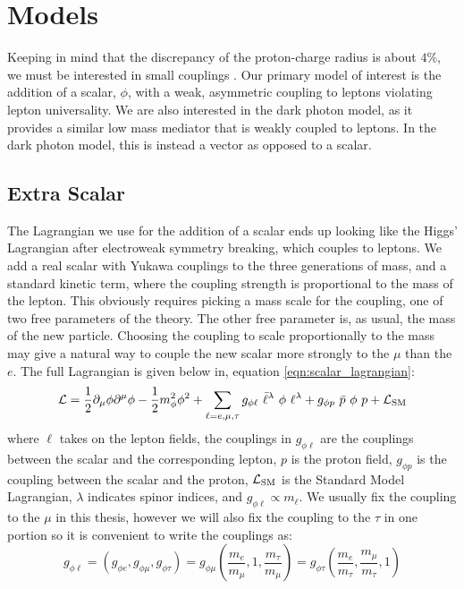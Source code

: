 \section{Models}

Keeping in mind that the discrepancy of the proton-charge radius is about $4\%$, we must be interested in small couplings \cite{Carlson:2015jba}.
Our primary model of interest is the addition of a scalar, $\phi$, with a weak, asymmetric coupling to leptons violating lepton universality.
We are also interested in the dark photon model, as it provides a similar low mass mediator that is weakly coupled to leptons.
In the dark photon model, this is instead a vector as opposed to a scalar.

\subsection{Extra Scalar}
The Lagrangian we use for the addition of a scalar ends up looking like the Higgs' Lagrangian after electroweak symmetry breaking, which couples to leptons.
We add a real scalar with Yukawa couplings to the three generations of mass, and a standard kinetic term, where the coupling strength is proportional to the mass of the lepton.
This obviously requires picking a mass scale for the coupling, one of two free parameters of the theory.
The other free parameter is, as usual, the mass of the new particle.
Choosing the coupling to scale proportionally to the mass may give a natural way to couple the new scalar more strongly to the $\mu$ than the $e$.
The full Lagrangian is given below in, equation \ref{eqn:scalar_lagrangian}:  
\begin{equation}
\label{eqn:scalar_lagrangian}
\operatorname{\mathcal{L}} = \frac{1}{2}\partial_\mu \phi \partial^\mu \phi - \frac{1}{2} m_\phi^2 \phi^2 + \sum_{\ell=e,\mu,\tau} g_{\phi \ell}~\bar{\ell}^\lambda~\phi~\ell^\lambda + g_{\phi p}~\bar{p}~\phi~p + \operatorname{\mathcal{L}}_{\textrm{SM}}
\end{equation} 
where $\ell$ takes on the lepton fields, the couplings in $g_{\phi \ell}$ are the couplings between the scalar and the corresponding lepton, $p$ is the proton field, $g_{\phi p}$ is the coupling between the scalar and the proton, $\operatorname{\mathcal{L}}_\textrm{SM}$ is the Standard Model Lagrangian, $\lambda$ indicates spinor indices, and $g_{\phi \ell} \propto m_\ell$.
We usually fix the coupling to the $\mu$ in this thesis, however we will also fix the coupling to the $\tau$ in one portion so it is convenient to write the couplings as:
\begin{equation*}
\label{eqn:coupling_mass}
g_{\phi \ell} = \left(g_{\phi e}, g_{\phi \mu}, g_{\phi \tau}\right) = g_{\phi \mu} \left( \frac{m_e}{m_\mu}, 1, \frac{m_\tau}{m_\mu} \right) = g_{\phi \tau} \left( \frac{m_e}{m_\tau}, \frac{m_\mu}{m_\tau}, 1 \right)
\end{equation*}

